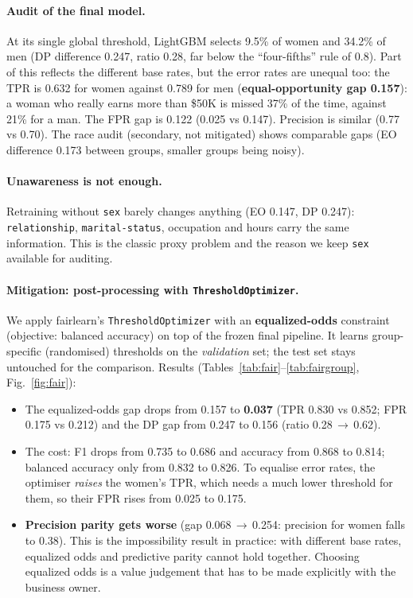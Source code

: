 \documentclass[10.5pt,a4paper]{article}
\newcommand{\code}[1]{\texttt{\small #1}}
\begin{document}
\paragraph{Audit of the final model.} At its single global threshold, LightGBM selects 9.5\% of women and
34.2\% of men (DP difference 0.247, ratio 0.28, far below the ``four-fifths'' rule of 0.8). Part of this
reflects the different base rates, but the error rates are unequal too: the TPR is 0.632 for women against
0.789 for men (\textbf{equal-opportunity gap 0.157}): a woman who really earns more than \$50K is missed
37\% of the time, against 21\% for a man. The FPR gap is 0.122 (0.025 vs 0.147). Precision is similar (0.77 vs
0.70). The race audit (secondary, not mitigated) shows comparable gaps (EO difference 0.173 between groups,
smaller groups being noisy).

\paragraph{Unawareness is not enough.} Retraining without \code{sex} barely changes anything (EO 0.147, DP
0.247): \code{relationship}, \code{marital-status}, occupation and hours carry the same information. This is
the classic proxy problem and the reason we keep \code{sex} available for auditing.

\paragraph{Mitigation: post-processing with \code{ThresholdOptimizer}.} We apply fairlearn's
\code{ThresholdOptimizer} with an \textbf{equalized-odds} constraint (objective: balanced accuracy) on top of
the frozen final pipeline. It learns group-specific (randomised) thresholds on the \emph{validation} set;
the test set stays untouched for the comparison. Results (Tables~\ref{tab:fair}--\ref{tab:fairgroup},
Fig.~\ref{fig:fair}):
\begin{itemize}
  \item The equalized-odds gap drops from 0.157 to \textbf{0.037} (TPR 0.830 vs 0.852; FPR 0.175 vs 0.212) and
  the DP gap from 0.247 to 0.156 (ratio 0.28\,$\rightarrow$\,0.62).
  \item The cost: F1 drops from 0.735 to 0.686 and accuracy from 0.868 to 0.814; balanced accuracy only from
  0.832 to 0.826. To equalise error rates, the optimiser \emph{raises} the women's TPR, which needs a much lower
  threshold for them, so their FPR rises from 0.025 to 0.175.
  \item \textbf{Precision parity gets worse} (gap 0.068\,$\rightarrow$\,0.254: precision for women falls to
  0.38). This is the impossibility result in practice: with different base rates, equalized odds and
  predictive parity cannot hold together. Choosing equalized odds is a value judgement that has to be made
  explicitly with the business owner.
\end{itemize}
\end{document}
